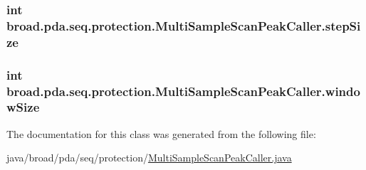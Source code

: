 \hypertarget{classbroad_1_1pda_1_1seq_1_1protection_1_1_multi_sample_scan_peak_caller_a7f46117f3c95d5ed4ae816db5807547d}{
\subsubsection[{step\+Size}]{\setlength{\rightskip}{0pt plus 5cm}int broad.\+pda.\+seq.\+protection.\+Multi\+Sample\+Scan\+Peak\+Caller.\+step\+Size\hspace{0.3cm}{\ttfamily [protected]}}}\label{classbroad_1_1pda_1_1seq_1_1protection_1_1_multi_sample_scan_peak_caller_a7f46117f3c95d5ed4ae816db5807547d}
\hypertarget{classbroad_1_1pda_1_1seq_1_1protection_1_1_multi_sample_scan_peak_caller_a0c59f72373adab957b0055903341dd61}{
\subsubsection[{window\+Size}]{\setlength{\rightskip}{0pt plus 5cm}int broad.\+pda.\+seq.\+protection.\+Multi\+Sample\+Scan\+Peak\+Caller.\+window\+Size\hspace{0.3cm}{\ttfamily [protected]}}}\label{classbroad_1_1pda_1_1seq_1_1protection_1_1_multi_sample_scan_peak_caller_a0c59f72373adab957b0055903341dd61}


The documentation for this class was generated from the following file\+:\begin{DoxyCompactItemize}
\item 
java/broad/pda/seq/protection/\hyperlink{_multi_sample_scan_peak_caller_8java}{Multi\+Sample\+Scan\+Peak\+Caller.\+java}\end{DoxyCompactItemize}
